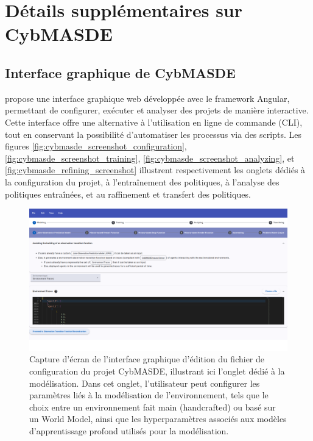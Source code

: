 \chapter{Détails supplémentaires sur CybMASDE}

\section{Interface graphique de CybMASDE}\label{appendix:cybmasde-gui}

 propose une interface graphique web développée avec le framework Angular, permettant de configurer, exécuter et analyser des projets de manière interactive. Cette interface offre une alternative à l'utilisation en ligne de commande (CLI), tout en conservant la possibilité d'automatiser les processus via des scripts. Les figures \autoref{fig:cybmasde_screenshot_configuration}, \autoref{fig:cybmasde_screenshot_training}, \autoref{fig:cybmasde_screenshot_analyzing}, et \autoref{fig:cybmasde_refining_screenshot} illustrent respectivement les onglets dédiés à la configuration du projet, à l'entraînement des politiques, à l'analyse des politiques entraînées, et au raffinement et transfert des politiques.

\begin{figure}[h!]
       \centering
       \includegraphics[width=\linewidth]{figures/CybMASDE_2.png}
       \caption[Capture d'écran de l'onglet modélisation de l'interface graphique de CybMASDE]{Capture d'écran de l'interface graphique d'édition du fichier de configuration du projet CybMASDE, illustrant ici l'onglet dédié à la modélisation. Dans cet onglet, l'utilisateur peut configurer les paramètres liés à la modélisation de l'environnement, tels que le choix entre un environnement fait main (handcrafted) ou basé sur un World Model, ainsi que les hyperparamètres associés aux modèles d'apprentissage profond utilisés pour la modélisation.}
       \label{fig:cybmasde_screenshot_configuration}
\end{figure}

